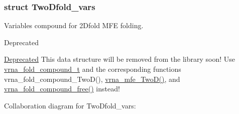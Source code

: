 \subsubsection{struct Two\+Dfold\+\_\+vars}
Variables compound for 2Dfold M\+FE folding. 

\begin{DoxyRefDesc}{Deprecated}
\item[\mbox{\hyperlink{deprecated__deprecated000001}{Deprecated}}]This data structure will be removed from the library soon! Use \mbox{\hyperlink{group__fold__compound_ga1b0cef17fd40466cef5968eaeeff6166}{vrna\+\_\+fold\+\_\+compound\+\_\+t}} and the corresponding functions vrna\+\_\+fold\+\_\+compound\+\_\+\+Two\+D(), \mbox{\hyperlink{group__kl__neighborhood__mfe_ga243c288b463147352829df04de6a2f77}{vrna\+\_\+mfe\+\_\+\+Two\+D()}}, and \mbox{\hyperlink{group__fold__compound_ga576a077b418a9c3650e06f8e5d296fc2}{vrna\+\_\+fold\+\_\+compound\+\_\+free()}} instead! \end{DoxyRefDesc}


Collaboration diagram for Two\+Dfold\+\_\+vars\+:
